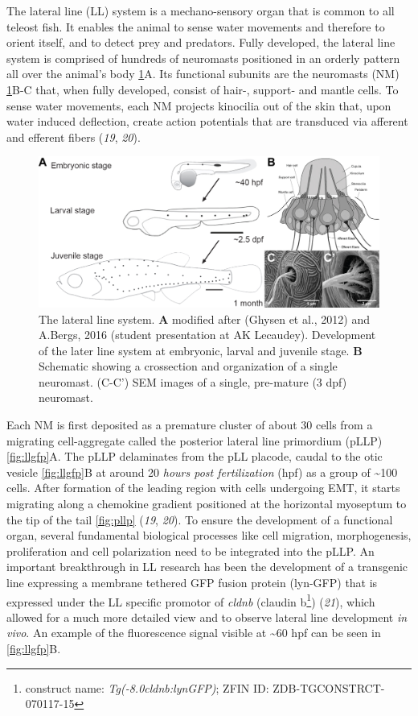 \documentclass[11pt,singlespacinge,twoside]{reedthesis} %
\begin{document}
The lateral line (LL) system is a mechano-sensory organ that is common to all teleost fish. It enables the animal to sense water movements and therefore to orient itself, and to detect prey and predators. Fully developed, the lateral line system is comprised of hundreds of neuromasts positioned in an orderly pattern all over the animal's body \ref{fig:llsystem}A. Its functional subunits are the neuromasts (NM) \ref{fig:llsystem}B-C that, when fully developed, consist of hair-, support- and mantle cells. To sense water movements, each NM projects kinocilia out of the skin that, upon water induced deflection, create action potentials that are transduced via afferent and efferent fibers (\emph{19}, \emph{20}).


\begin{figure}

{\centering \includegraphics[width=.95\textwidth]{figures/intro/ll_system} 

}

\caption[The lateral line system]{The lateral line system. \textbf{A} modified after (Ghysen et al., 2012) and A.Bergs, 2016 (student presentation at AK Lecaudey). Development of the later line system at embryonic, larval and juvenile stage. \textbf{B} Schematic showing a crossection and organization of a single neuromast. (C-C') SEM images of a single, pre-mature (3 dpf) neuromast.}\label{fig:llsystem}
\end{figure}
Each NM is first deposited as a premature cluster of about 30 cells from a migrating cell-aggregate called the posterior lateral line primordium (pLLP) \ref{fig:llgfp}A. The pLLP delaminates from the pLL placode, caudal to the otic vesicle \ref{fig:llgfp}B at around 20 \emph{hours post fertilization} (hpf) as a group of \textasciitilde{}100 cells. After formation of the leading region with cells undergoing EMT, it starts migrating along a chemokine gradient positioned at the horizontal myoseptum to the tip of the tail \ref{fig:pllp} (\emph{19}, \emph{20}). To ensure the development of a functional organ, several fundamental biological processes like cell migration, morphogenesis, proliferation and cell polarization need to be integrated into the pLLP.
An important breakthrough in LL research has been the development of a transgenic line expressing a membrane tethered GFP fusion protein (lyn-GFP) that is expressed under the LL specific promotor of \emph{cldnb} (claudin b\footnote{construct name: \emph{Tg(-8.0cldnb:lynGFP)}; ZFIN ID: ZDB-TGCONSTRCT-070117-15}) (\emph{21}), which allowed for a much more detailed view and to observe lateral line development \emph{in vivo}. An example of the fluorescence signal visible at \textasciitilde{}60 hpf can be seen in \ref{fig:llgfp}B.
\end{document}
